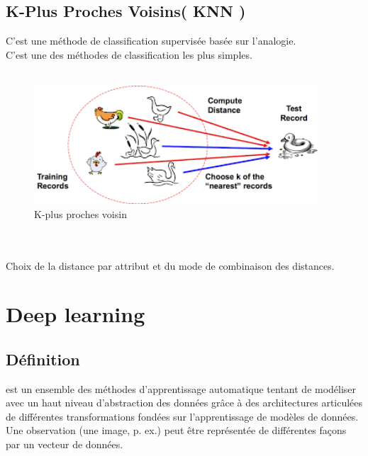 \documentclass[12pt]{report}
\begin{document}
\subsection{K-Plus Proches Voisins( KNN )}
C'est une méthode de classification supervisée  basée sur l'analogie.\\
C'est une des méthodes de classification les plus simples.\\\\

\begin{figure}[h]
\begin{center}
\includegraphics[width=400]{knn.png}
\caption{K-plus proches voisin}
\label{K-plus proches voisin}
\end{center}
\end{figure}
\\\\
Choix de la distance par attribut et du mode de combinaison des distances.







\newpage
\section{Deep learning}

\subsection{Définition}
 est un ensemble des méthodes d’apprentissage automatique tentant de modéliser avec un haut niveau d’abstraction des données grâce à des architectures articulées de différentes transformations fondées sur l’apprentissage de modèles de données. Une observation (une image, p. ex.) peut être représentée de différentes façons par un vecteur de données.
\end{document}
